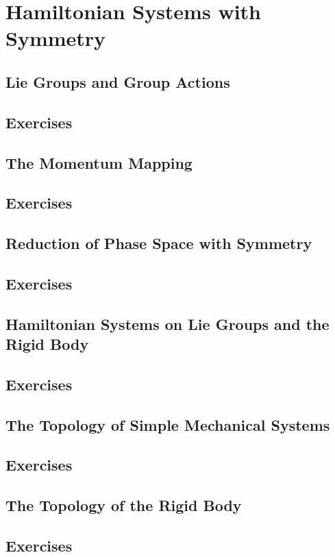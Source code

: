 \chapter{Hamiltonian Systems with Symmetry}
\section{Lie Groups and Group Actions}
\section*{Exercises}
\section{The Momentum Mapping}
\section*{Exercises}
\section{Reduction of Phase Space with Symmetry}
\section*{Exercises}
\section{Hamiltonian Systems on Lie Groups and the Rigid Body}
\section*{Exercises}
\section{The Topology of Simple Mechanical Systems}
\section*{Exercises}
\section{The Topology of the Rigid Body}
\section*{Exercises}
